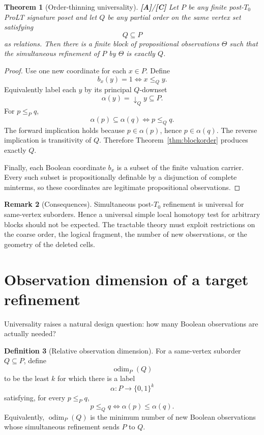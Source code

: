 \documentclass[11pt]{article}
\newtheorem{theorem}{Theorem}[section]
\theoremstyle{definition}
\newtheorem{definition}[theorem]{Definition}
\newtheorem{remark}[theorem]{Remark}
\newcommand{\odim}{\operatorname{odim}}
\newcommand{\statusA}{\textbf{[A]}}
\newcommand{\statusC}{\textbf{[C]}}
\begin{document}
\begin{theorem}[Order-thinning universality]\label{thm:universality}
\statusA/\statusC\;
Let $P$ be any finite post-$T_0$ ProLT signature poset and let $Q$ be any partial order on the same vertex set satisfying
\[
Q\subseteq P
\]
as relations. Then there is a finite block of propositional observations $\Theta$ such that the simultaneous refinement of $P$ by $\Theta$ is exactly $Q$.
\end{theorem}

\begin{proof}
Use one new coordinate for each $x\in P$. Define
\[
b_x(y)=1\iff x\le_Q y.
\]
Equivalently label each $y$ by its principal $Q$-downset
\[
\alpha(y)=\downarrow_Q y\subseteq P.
\]
For $p\le_P q$,
\[
\alpha(p)\subseteq\alpha(q)
\iff
p\le_Q q.
\]
The forward implication holds because $p\in\alpha(p)$, hence $p\in\alpha(q)$. The reverse implication is transitivity of $Q$. Therefore Theorem~\ref{thm:blockorder} produces exactly $Q$.

Finally, each Boolean coordinate $b_x$ is a subset of the finite valuation carrier. Every such subset is propositionally definable by a disjunction of complete minterms, so these coordinates are legitimate propositional observations.
\end{proof}

\begin{remark}[Consequences]
Simultaneous post-$T_0$ refinement is universal for same-vertex suborders. Hence a universal simple local homotopy test for arbitrary blocks should not be expected. The tractable theory must exploit restrictions on the coarse order, the logical fragment, the number of new observations, or the geometry of the deleted cells.
\end{remark}

\section{Observation dimension of a target refinement}

Universality raises a natural design question: how many Boolean observations are actually needed?

\begin{definition}[Relative observation dimension]\label{def:odim}
For a same-vertex suborder $Q\subseteq P$, define
\[
\odim_P(Q)
\]
to be the least $k$ for which there is a label
\[
\alpha:P\to\{0,1\}^k
\]
satisfying, for every $p\le_P q$,
\[
p\le_Q q
\iff
\alpha(p)\le\alpha(q).
\]
Equivalently, $\odim_P(Q)$ is the minimum number of new Boolean observations whose simultaneous refinement sends $P$ to $Q$.
\end{definition}
\end{document}
